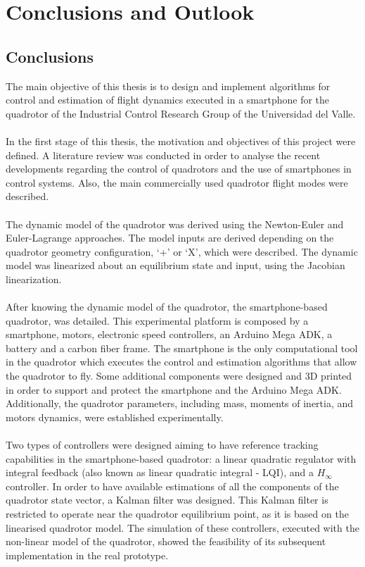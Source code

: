 \chapter{Conclusions and Outlook \label{ch:conclusions}}
\section{Conclusions}
The main objective of this thesis is to design and implement algorithms for control and estimation of flight dynamics executed in a smartphone for the quadrotor of the Industrial Control Research Group of the Universidad del Valle.
\\\\
In the first stage of this thesis, the motivation and objectives of this project were defined. A literature review was conducted in order to analyse the recent developments regarding the control of quadrotors and the use of smartphones in control systems. Also, the main commercially used quadrotor flight modes were described.
\\\\
The dynamic model of the quadrotor was derived using the Newton-Euler and Euler-Lagrange approaches. The model inputs are derived depending on the quadrotor geometry configuration, `+' or `X', which were described. The dynamic model was linearized about an equilibrium state and input, using the Jacobian linearization.
\\\\
After knowing the dynamic model of the quadrotor, the smartphone-based quadrotor, was detailed. This experimental platform is composed by a smartphone, motors, electronic speed controllers, an Arduino Mega ADK, a battery and a carbon fiber frame. The smartphone is the only computational tool in the quadrotor which executes the control and estimation algorithms that allow the quadrotor to fly. Some additional components were designed and 3D printed in order to support and protect the smartphone and the Arduino Mega ADK. Additionally, the quadrotor parameters, including mass, moments of inertia, and motors dynamics, were established experimentally.
\\\\
Two types of controllers were designed aiming to have reference tracking capabilities in the smartphone-based quadrotor: a linear quadratic regulator with integral feedback (also known as linear quadratic integral - LQI), and a $H_\infty$ controller. In order to have available estimations of all the components of the quadrotor state vector, a Kalman filter was designed. This Kalman filter is restricted to operate near the quadrotor equilibrium point, as it is based on the linearised quadrotor model. The simulation of these controllers, executed with the non-linear model of the quadrotor, showed the feasibility of its subsequent implementation in the real prototype.
